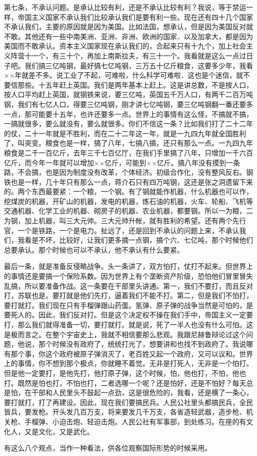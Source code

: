 第七条，不承认问题。是承认比较有利，还是不承认比较有利？我说，等于禁运一样，帝国主义国家不承认我们比较承认我们是要有利一些。现在还有四十几个国家不承认我们，主要的原因就是因为美国。比如法国，想承认，但是因为美国反对就不敢。其他还有一些中南美洲、亚洲、非洲、欧洲的国家．以及加拿大，都是因为美国而不敢承认。资本主义国家现在承认我们的，合起来只有十九个，加上社会主义阵营十一个，有三十个，再加上南斯拉夫，有三十一个。我看就是这么一点过日子吧。我们搞三亿吨钢，最好搞七亿吨钢，三万五十亿斤粮食，这要多少年，我看××年就差不多。说工业了不起，可难啦，什么科学可难啦．这也是个迷信，就不要信那些。十五年赶上英国。我们是两年基本上赶上。这是讲总数，不是按人口，按人口平均赶上英国，就钢铁来说，要三亿吨，英国五千万人口，有两千二百万吨钢，我们有七亿人口，得要三亿吨钢，刚才讲七亿吨钢，要三亿吨钢翻一番还要多一点，那可能要十五年，也许还要多一点。世界上的事情有这么怪，不搞就不搞，一搞就很多，要么就没有，要么就很多。你们不信这一条？比如我们打了二十二年的仗，二十一年就是不胜利，而在二十二年这一年，就是一九四九年就全国胜利了，叫突变。粮食也是一样，搞了八年，七搞八搞，还只有那么一点。一九四九年粮食是二千一百亿斤，去年三千七百亿厅，在我们手里搞了八年，只增加一千六百亿斤，而今年一年就可以增加××亿斤，可能到××亿斤。搞八年没有摸到一条路，不会搞，也是因为制度没有改革，个体经济。初级合作化，没有整风反右。钢铁也是一样，几十年只有那么一点，蒋介石只有四万吨钢，这还是张之洞遗留下来的。两个东西最要紧：一个粮，一个钢。有了钢就能作机器，什么机器也可以作，挖煤炭的机器，开矿山的机器，发电的机器，炼石油的机器，火车、轮船、飞机等交通机器、化学工业的机器、砌房子的机器、农业机器，都要钢。所以一为粮，二为钢，加上机器，叫三大元帅。三大元帅升帐，就有胜利的希望。还有两个先行官，一个是铁路，一个是电力。扯远了，还是回到不承认的问题上来，不承认我们，我看是不坏，比较好，让我们更多摘一点钢，搞个六、七亿吨，那个时候他们总要承认。那个时候也可以不承认，他不承认有什么要紧。

最后一条，就是准备反侵略战争。头一条讲了，双方怕打，仗打不起来。但世界上的事情还是要搞一个保险系数。因为世界上有个垄断资产阶级，恐怕他们冒里冒失乱搞，所以要准备作战。这一条要在干部里头讲通。第一，我们不要打，而且反对打，苏联也是。要打就是他们先打，逼着我们不能不打。第二，但是我们不怕打，要打就打。我们现在只有手榴弹跟山药蛋。氢弹、原子弹的战争当然是可怕的，是要死人的。因此，我们反对打。但是这个决定权不操在我们手中，帝国主义一定要打，那么我们就得准备一切，要打就打。就是说，死了一半人也没有什么可怕。这是极而言之。在整个宇宙史上，我就不相信要那么悲观。我跟尼赫鲁辩论过这个问题，他说，那个时候没有政府了，统统打光了，想要讲和也找不到政府了。我说哪有那个事，你这个政府被原子弹消灭了，老百姓又起一个政府，又可以议和。世界上的事情，你不想到那个极点，你就睡不着觉。无非是打死人，无非是一个怕打。但是他一定要打，是他先打，他打原子弹，这个时候，怕，他也打，不怕，他也打。既然是怕也打，不怕也打，二者选哪一个呢？还是怕好，还是不怕好？每天总是怕，在干部和人民里头不鼓起一点劲，这是很危险的，我看，还是横了一条心，要打就打，打了再建设。因此，现在我们要搞民兵。人民公社里头都搞民兵，全民皆兵，要发枪。开头发几百万支，将来要发几千万支，各省造轻武器，造步枪、机关枪、手榴弹、小迫击炮、轻迫击炮。人民公社有军事部，到处练习。在座的有文化人，又是文化，又是武化。

有这么八个观点，当作一种看法，供各位观察国际形势的时候采用。


